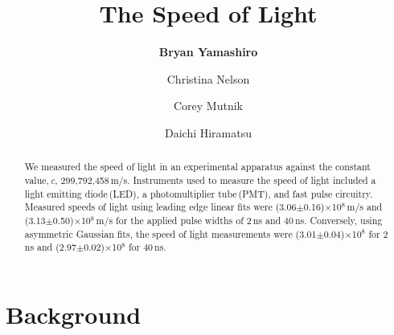 \documentclass[aps,prl,twocolumn,superscriptaddress,nofootinbib]{revtex4-1}
\begin{document}





\title{The Speed of Light}


\author{\textbf{Bryan Yamashiro}}
\author{Christina Nelson}
\author{Corey Mutnik}
\author{Daichi Hiramatsu}






\begin{abstract}

We measured the speed of light in an experimental apparatus against the constant value,\,\textit{c}, 299,792,458\,m/s. Instruments used to measure the speed of light included a light emitting diode\,(LED), a photomultiplier tube\,(PMT), and fast pulse circuitry. Measured speeds of light using leading edge linear fits were (3.06$\pm$0.16)$\times$10$^8$\,m/s and (3.13$\pm$0.50)$\times$10$^8$\,m/s for the applied pulse widths of 2\,ns and 40\,ns. Conversely, using asymmetric Gaussian fits, the speed of light measurements were (3.01$\pm$0.04)$\times$10$^8$ for 2\,ns and (2.97$\pm$0.02)$\times$10$^8$ for 40\,ns.




\end{abstract}

\maketitle    %


\section{Background}
\end{document}
